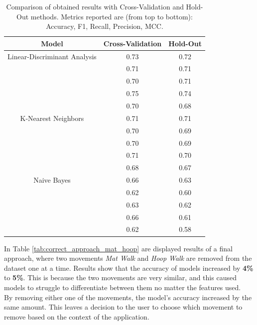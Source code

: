                 \begin{table}[htbp]
                    \centering
                    \begin{tabular}{|c|c|c|}
                    \hline
                    \textbf{Model} & \textbf{Cross-Validation} & \textbf{Hold-Out} \\ \hline
                        Linear-Discriminant Analysis    & 0.73 & 0.72 \\ 
                                                        & 0.71 & 0.71 \\ 
                                                        & 0.70 & 0.71 \\ 
                                                        & 0.75 & 0.74 \\
                                                        & 0.70 & 0.68 \\ 
                                                        \hline
                        K-Nearest Neighbors             & 0.71 & 0.71 \\ 
                                                        & 0.70 & 0.69 \\ 
                                                        & 0.70 & 0.69 \\ 
                                                        & 0.71 & 0.70 \\
                                                        & 0.68 & 0.67 \\
                                                        \hline
                        Naive Bayes                     & 0.66 & 0.63 \\ 
                                                        & 0.62 & 0.60 \\ 
                                                        & 0.63 & 0.62 \\
                                                        & 0.66 & 0.61 \\ 
                                                        & 0.62 & 0.58 \\ 
                                                        \hline
                    \end{tabular}
                    \caption{Comparison of obtained results with Cross-Validation and Hold-Out methods. Metrics reported are (from top to bottom): Accuracy, F1, Recall, Precision, MCC.}
                    \label{tab:correct_approach_cv}
                \end{table}
                \newpage
                In Table \ref{tab:correct_approach_mat_hoop} are displayed results of a final approach, where two movements \textit{Mat Walk} and \textit{Hoop Walk} are removed from the dataset one at a time. Results show that the accuracy of models increased by \textbf{4\%} to \textbf{5\%}. This is because the two movements are very similar, and this caused models to struggle to differentiate between them no matter the features used. \\
                By removing either one of the movements, the model's accuracy increased by the same amount. This leaves a decision to the user to choose which movement to remove based on the context of the application. 

